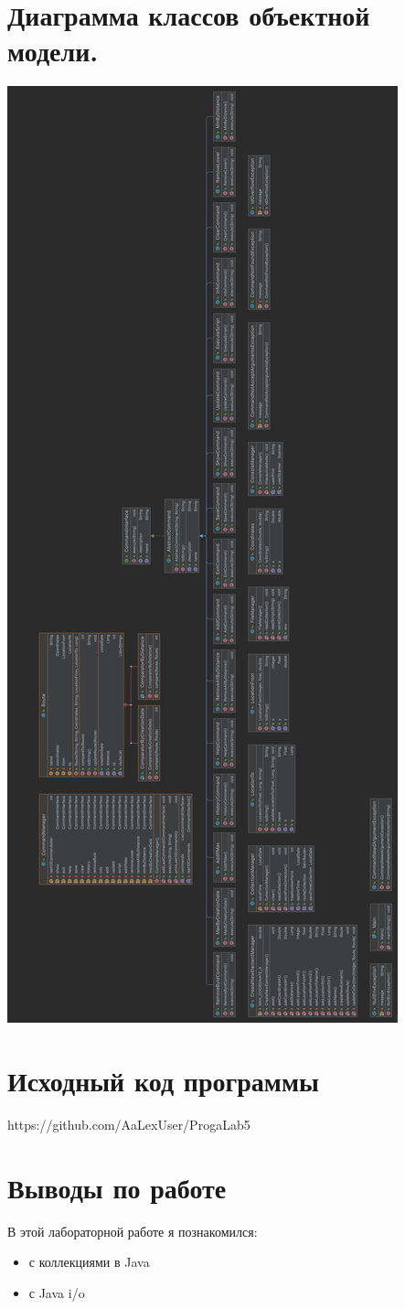 \documentclass[12pt,onecolumn]{article}
\begin{document}
\section{Диаграмма классов объектной модели.}
\includegraphics[scale=0.1]{UML.png}
\section{Исходный код программы}
https://github.com/AaLexUser/ProgaLab5
\section{Выводы по работе}
В этой лабораторной работе я познакомился:
\begin{itemize}
    \item с коллекциями в Java
    \item с Java i/o
\end{itemize}
\end{document}
